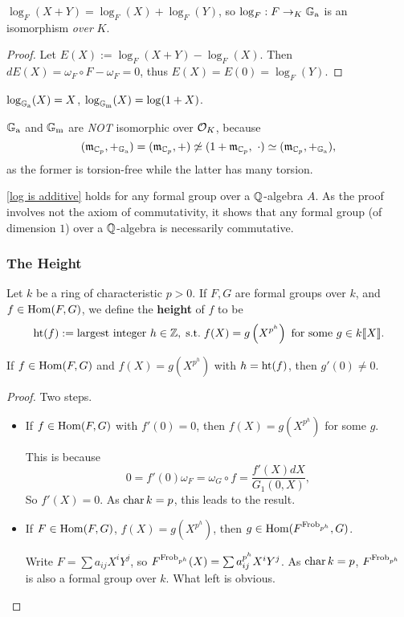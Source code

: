\begin{proposition}\label{log is additive}
    $\log_F(X + Y) = \log_F(X) + \log_F(Y)$, so $\log_F : F\to_{K} {\mathbb{G}_{\mathrm{a}}}$ is an isomorphism \textit{over} $K$.
\end{proposition}
\begin{proof}
    Let $E(X) := \log_F(X + Y) - \log_F(X)$.
    Then $dE(X) = \omega_F\circ F - \omega_F = 0$,
    thus $E(X) = E(0) = \log_F(Y)$.
\end{proof}
\begin{example}
    $\log_{{\mathbb{G}_{\mathrm{a}}}}(X) = X$, $\log_{{\mathbb{G}_{\mathrm{m}}}}(X) = \log(1 + X)$.
\end{example}
\begin{example}
    ${\mathbb{G}_{\mathrm{a}}}$ and ${\mathbb{G}_{\mathrm{m}}}$ are \textit{NOT} isomorphic over $\mathcal{O}_K$, because \[(\mathfrak{m}_{\mathbb{C}_p}, +_{{\mathbb{G}_{\mathrm{a}}}})
     = (\mathfrak{m}_{\mathbb{C}_p}, +)
     \not\simeq (1 + \mathfrak{m}_{\mathbb{C}_p}, \ \cdot)
     \simeq (\mathfrak{m}_{\mathbb{C}_p}, +_{{\mathbb{G}_{\mathrm{a}}}}),\]
    as the former is torsion-free while the latter has many torsion.
\end{example}
\begin{remark}
    \cref{log is additive} holds for any formal group over a $\mathbb{Q}$-algebra $A$.
    As the proof involves not the axiom of commutativity,
    it shows that any formal group (of dimension $1$) over a $\mathbb{Q}$-algebra is necessarily commutative.
\end{remark}

\subsubsection{The Height}
Let $k$ be a ring of characteristic $p >0$.
If $F, G$ are formal groups over $k$,
and $f\in\operatorname{Hom}(F, G)$, we define the \textbf{height} of $f$ to be
\[\operatorname{ht}(f) := \text{largest integer } h\in\mathbb{Z} ,\;\mathrm{s.t.}\; f(X) = g\left( X^{p^h} \right) \text{ for some } g\in k\llbracket X \rrbracket.\]
\begin{proposition}
    If $f\in \operatorname{Hom}(F, G)$ and $f(X) = g\left( X^{p^h} \right)$ with $h = \operatorname{ht}(f)$,
    then $g'(0)\ne 0$.
\end{proposition}
\begin{proof}
    Two steps.
    \begin{itemize}
        \item If $f\in \operatorname{Hom}(F, G)$ with $f'(0) = 0$,
        then $f(X) = g\left( X^{p^h} \right)$ for some $g$.

        This is because \[0 = f'(0)\omega_F = \omega_G\circ f = \frac{f'(X)dX }{G_1(0, X )},\]
        So $f'(X) = 0$. As $\operatorname{char} k = p$,
        this leads to the result.
        \item If $F\in\operatorname{Hom}(F, G)$, $f(X) = g\left( X^{p^h} \right)$, then $g\in\operatorname{Hom}(F^{\operatorname{Frob}_{p^h}}, G)$.

        Write $F = \sum a_{ij}X^iY^j$, so $F^{\operatorname{Frob}_{p^h}}(X) = \sum a_{ij}^{p^h}X^iY^j$. As $\operatorname{char} k = p$, $F^{\operatorname{Frob}_{p^h}}$ is also a formal group over $k$.
        What left is obvious.\qedhere
    \end{itemize}
\end{proof}


